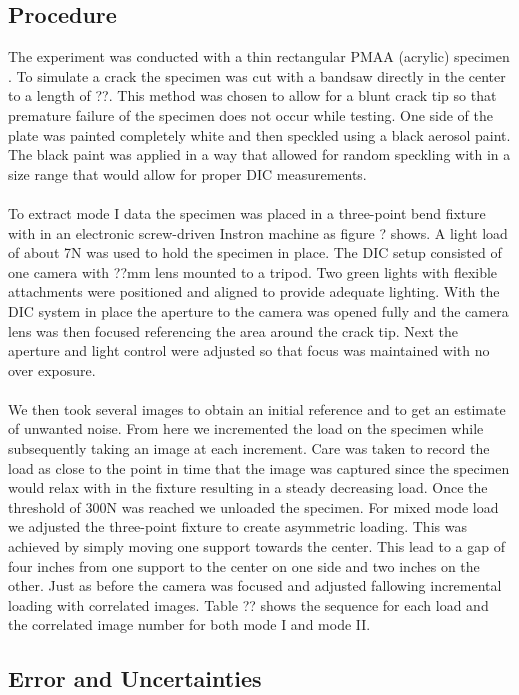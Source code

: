 \documentclass[12pt]{article}
\begin{document}
\subsection{Procedure} %
The experiment was conducted with a thin rectangular PMAA (acrylic) specimen .  To simulate a crack the specimen was cut with a bandsaw directly in the center to a length of ??. This  method was chosen to allow for a blunt crack tip so that premature failure of the specimen does not occur while testing.  One side of the plate was painted  completely white and then speckled using a black aerosol paint.  The black paint was applied in a way that allowed for random speckling with in a size range that would allow for proper DIC measurements.
\\ \\
To extract mode I data the  specimen was placed in a three-point bend fixture with in an electronic screw-driven Instron machine as figure ? shows. A light load of about 7N was used to hold the specimen in place.
The DIC setup consisted of one camera with ??mm lens mounted to a tripod.  Two green lights with flexible attachments were positioned and aligned to provide adequate lighting. With the DIC system in place the aperture to the camera was opened fully and the camera lens was then focused referencing the area around the crack tip. Next the aperture and light control were adjusted so that focus was maintained with no over exposure. 
\\
\\
We then took several images to obtain an initial reference and to get an estimate of unwanted noise. From here we incremented the load on the specimen while subsequently taking an image at each increment. Care was taken to record the load as close to the point in time that the image was captured since the specimen would relax with in the fixture resulting in a steady decreasing load. Once the threshold of 300N was reached we unloaded the specimen.  For mixed mode load we adjusted the three-point fixture to create asymmetric loading. This was achieved by simply moving one support towards the center.  This lead to a gap of four inches from one support to the center on one side and two inches on the other. Just as before the camera was focused and adjusted fallowing incremental loading with correlated images. Table ?? shows the sequence for each load and the correlated image number for both mode I and mode II.  
\subsection{Error and Uncertainties} %
\end{document}
